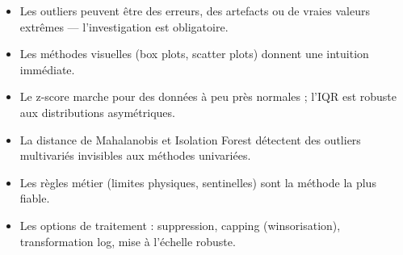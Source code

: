 \begin{itemize}
  \item Les outliers peuvent \^etre des erreurs, des artefacts ou de vraies valeurs extr\^emes --- l'investigation est obligatoire.
  \item Les m\'ethodes visuelles (box plots, scatter plots) donnent une intuition imm\'ediate.
  \item Le z-score marche pour des donn\'ees \`a peu pr\`es normales ; l'IQR est robuste aux distributions asym\'etriques.
  \item La distance de Mahalanobis et Isolation Forest d\'etectent des outliers multivari\'es invisibles aux m\'ethodes univari\'ees.
  \item Les r\`egles m\'etier (limites physiques, sentinelles) sont la m\'ethode la plus fiable.
  \item Les options de traitement : suppression, capping (winsorisation), transformation log, mise \`a l'\'echelle robuste.
\end{itemize}
